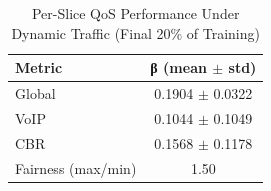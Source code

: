 \begin{table}[!t]
\centering
\caption{Per-Slice QoS Performance Under Dynamic Traffic (Final 20\% of Training)}
\label{tab:per_slice_beta}
\begin{tabular}{lc}
\toprule
\textbf{Metric} & \textbf{β (mean $\pm$ std)} \\
\midrule
Global & 0.1904 $\pm$ 0.0322 \\
VoIP & 0.1044 $\pm$ 0.1049 \\
CBR & 0.1568 $\pm$ 0.1178 \\
Fairness (max/min) & 1.50 \\
\bottomrule
\end{tabular}
\end{table}
